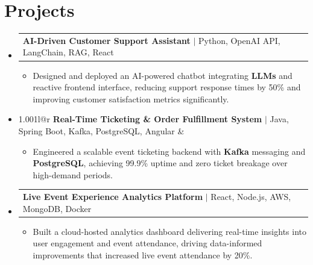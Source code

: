 \documentclass[letterpaper,10pt]{article}
\makeatletter
\newcommand{\resumeItem}[1]{
  \item{\fontsize{8pt}{9pt}\selectfont
    #1 \vspace{-3pt}
  }
}
\newcommand{\resumeProjectHeading}[2]{
    \item
    \begin{tabular*}{1.001\textwidth}{l@{\extracolsep{\fill}}r}
      \fontsize{8.5pt}{10pt}#1 & \textbf{\fontsize{8.5pt}{10pt} #2}\\
    \end{tabular*}\vspace{-7pt}
}
\newcommand{\resumeSubHeadingListStart}{\begin{itemize}[leftmargin=0pt, label={}]}
\newcommand{\resumeSubHeadingListEnd}{\end{itemize}}
\newcommand{\resumeItemListStart}{\begin{itemize}[leftmargin=*]}
\newcommand{\resumeItemListEnd}{\end{itemize}\vspace{-5pt}}
\makeatother
\begin{document}
\section{Projects}
    \vspace{-5pt}
    \resumeSubHeadingListStart
          \resumeProjectHeading
            {\textbf{AI-Driven Customer Support Assistant} $|$ Python, OpenAI API, LangChain, RAG, React}{}
            \resumeItemListStart
                \resumeItem{Designed and deployed an AI-powered chatbot integrating \textbf{LLMs} and reactive frontend interface, reducing support response times by 50\% and improving customer satisfaction metrics significantly.}
            \resumeItemListEnd
        \vspace{-12pt}
    
        \resumeProjectHeading
            {\textbf{Real-Time Ticketing & Order Fulfillment System} $|$ Java, Spring Boot, Kafka, PostgreSQL, Angular}{}
        \resumeItemListStart
                \resumeItem{Engineered a scalable event ticketing backend with \textbf{Kafka} messaging and \textbf{PostgreSQL}, achieving 99.9\% uptime and zero ticket breakage over high-demand periods.}
        \resumeItemListEnd
      \vspace{-12pt}
      \resumeProjectHeading
        {\textbf{Live Event Experience Analytics Platform} $|$ React, Node.js, AWS, MongoDB, Docker}{}
    \resumeItemListStart
            \resumeItem{Built a cloud-hosted analytics dashboard delivering real-time insights into user engagement and event attendance, driving data-informed improvements that increased live event attendance by 20\%.}
    \resumeItemListEnd
    \resumeSubHeadingListEnd
\end{document}
